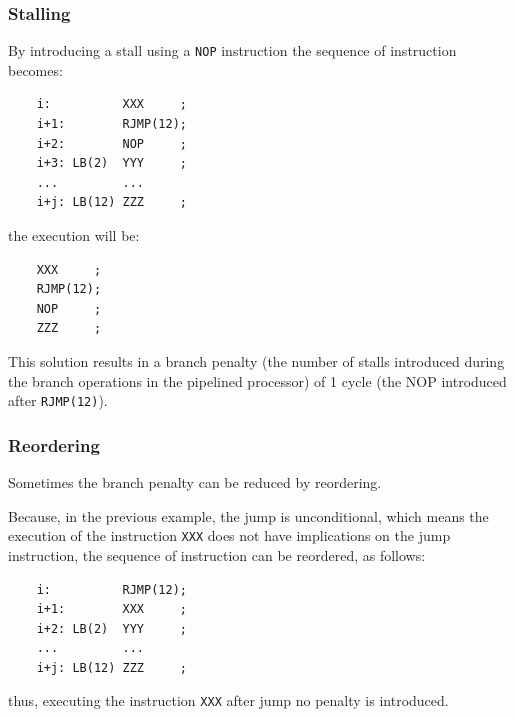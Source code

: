 \subsubsection{Stalling}

By introducing a stall using a {\tt NOP} instruction the sequence of instruction becomes:
\begin{verbatim}
    i:          XXX     ;
    i+1:        RJMP(12);
    i+2:        NOP     ;
    i+3: LB(2)  YYY     ;
    ...         ...
    i+j: LB(12) ZZZ     ;
\end{verbatim}
the execution will be:
\begin{verbatim}
    XXX     ;
    RJMP(12);
    NOP     ;
    ZZZ     ;
\end{verbatim}
This solution results in a branch penalty (the number of stalls introduced during the branch operations in the pipelined processor) of 1 cycle (the  NOP introduced after {\tt RJMP(12)}).

\subsubsection{Reordering}

Sometimes the branch penalty can be reduced by reordering.

Because, in the previous example, the jump is unconditional, which means the execution of the instruction {\tt XXX} does not have implications on the jump instruction, the sequence of instruction can be reordered, as follows:
\begin{verbatim}
    i:          RJMP(12);
    i+1:        XXX     ;
    i+2: LB(2)  YYY     ;
    ...         ...
    i+j: LB(12) ZZZ     ;
\end{verbatim}
thus,  executing the instruction {\tt XXX} after jump no penalty is introduced.

